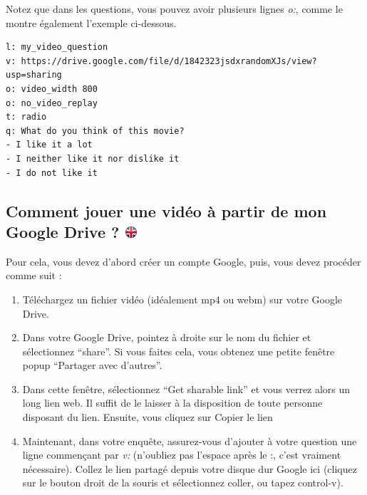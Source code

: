 \documentclass[
]{book}
\providecommand{\tightlist}{%
  \setlength{\itemsep}{0pt}\setlength{\parskip}{0pt}}
\begin{document}
Notez que dans les questions, vous pouvez avoir plusieurs lignes
\emph{o:}, comme le montre également l'exemple ci-dessous.

\begin{verbatim}
l: my_video_question
v: https://drive.google.com/file/d/1842323jsdxrandomXJs/view?usp=sharing
o: video_width 800
o: no_video_replay
t: radio
q: What do you think of this movie?
- I like it a lot
- I neither like it nor dislike it
- I do not like it
\end{verbatim}

\hypertarget{comment-jouer-une-viduxe9o-uxe0-partir-de-mon-google-drive}{%
\subsection[Comment jouer une vidéo à partir de mon Google Drive ?
]{\texorpdfstring{Comment jouer une vidéo à partir de mon Google Drive ?
\href{https://www.psytoolkit.org/lessons/surveyaudiovideo.html\#_how_to_play_a_video_from_my_google_drive}{\protect\includegraphics{img/ukflag.png}}}{Comment jouer une vidéo à partir de mon Google Drive ? }}\label{comment-jouer-une-viduxe9o-uxe0-partir-de-mon-google-drive}}

Pour cela, vous devez d'abord créer un compte Google, puis, vous devez
procéder comme suit :

\begin{enumerate}
\def\labelenumi{\arabic{enumi}.}
\tightlist
\item
  Téléchargez un fichier vidéo (idéalement mp4 ou webm) sur votre Google
  Drive.
\item
  Dans votre Google Drive, pointez à droite sur le nom du fichier et
  sélectionnez ``share''. Si vous faites cela, vous obtenez une petite
  fenêtre popup ``Partager avec d'autres''.
\item
  Dans cette fenêtre, sélectionnez ``Get sharable link'' et vous verrez
  alors un long lien web. Il suffit de le laisser à la disposition de
  toute personne disposant du lien. Ensuite, vous cliquez sur Copier le
  lien
\item
  Maintenant, dans votre enquête, assurez-vous d'ajouter à votre
  question une ligne commençant par \emph{v: } (n'oubliez pas l'espace
  après le :, c'est vraiment nécessaire). Collez le lien partagé depuis
  votre disque dur Google ici (cliquez sur le bouton droit de la souris
  et sélectionnez coller, ou tapez control-v).
\end{enumerate}
\end{document}
